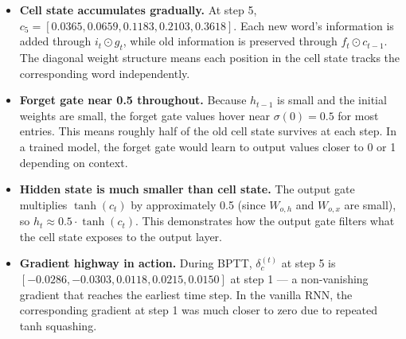 \begin{itemize}
    \item \textbf{Cell state accumulates gradually.} At step 5, {\scriptsize $c_5 = [0.0365, 0.0659, 0.1183, 0.2103, 0.3618]$}. Each new word's information is added through $i_t \odot g_t$, while old information is preserved through $f_t \odot c_{t-1}$. The diagonal weight structure means each position in the cell state tracks the corresponding word independently.

    \item \textbf{Forget gate near 0.5 throughout.} Because $h_{t-1}$ is small and the initial weights are small, the forget gate values hover near $\sigma(0) = 0.5$ for most entries. This means roughly half of the old cell state survives at each step. In a trained model, the forget gate would learn to output values closer to 0 or 1 depending on context.

    \item \textbf{Hidden state is much smaller than cell state.} The output gate multiplies $\tanh(c_t)$ by approximately 0.5 (since $W_{o,h}$ and $W_{o,x}$ are small), so $h_t \approx 0.5 \cdot \tanh(c_t)$. This demonstrates how the output gate filters what the cell state exposes to the output layer.

    \item \textbf{Gradient highway in action.} During BPTT, $\delta_c^{(t)}$ at step 5 is\\
{\scriptsize $[-0.0286, -0.0303, 0.0118, 0.0215, 0.0150]$} at step 1 --- a non-vanishing gradient that reaches the earliest time step. In the vanilla RNN, the corresponding gradient at step 1 was much closer to zero due to repeated tanh squashing.
\end{itemize}